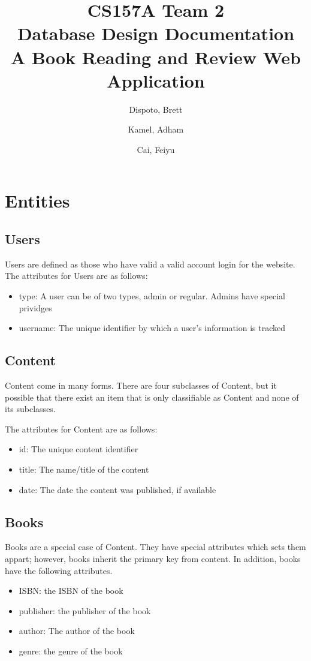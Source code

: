 \documentclass[letter, 12pt, titlepage]{article}
\author{
	Dispoto, Brett\\
        \and
        Kamel, Adham\\
        \and
        Cai, Feiyu\\
}
\title{CS157A Team 2 \\ Database Design Documentation \\
        \large A Book Reading and Review Web Application}
\begin{document}
  \maketitle
	\section{Entities}
		\subsection{Users}
			Users are defined as those who have valid a valid account login for the website.
			The attributes for Users are as follows:
			\begin{itemize}
				\item type: A user can be of two types, admin or regular. Admins have special prividges
				\item username: The unique identifier by which a user's information is tracked
			\end{itemize}
		\subsection{Content}
				Content come in many forms. There are four subclasses of Content, but it possible that there exist an item that is only classifiable as Content and none of its subclasses. 
			
				The attributes for Content are as follows:
			\begin{itemize}
				\item id: The unique content identifier
				\item title: The name/title of the content
				\item date: The date the content was published, if available
			\end{itemize}
			\subsection{Books}
				Books are a special case of Content. They have special attributes which sets them appart; however, books inherit the primary key from content. In addition, books have the following attributes.
			\begin{itemize}
				\item ISBN: the ISBN of the book
				\item publisher: the publisher of the book
				\item author: The author of the book
				\item genre: the genre of the book
			\end{itemize}
\end{document}
